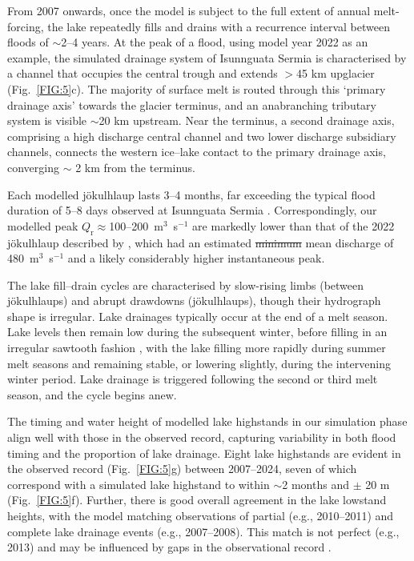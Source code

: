 \documentclass[tc, manuscript]{copernicus}
\providecommand{\DIFadd}[1]{{\protect\color{blue}\uwave{#1}}} %
\providecommand{\DIFdel}[1]{{\protect\color{red}\sout{#1}}} %
\providecommand{\DIFaddbegin}{} %
\providecommand{\DIFaddend}{} %
\providecommand{\DIFdelbegin}{} %
\providecommand{\DIFdelend}{} %
\begin{document}
From 2007 onwards, once the model is subject to the full extent of annual melt-forcing, the lake repeatedly fills and drains with a recurrence interval between floods of $\sim$2--4 years. At the peak of a flood, using model year 2022 as an example, the simulated drainage system of Isunnguata Sermia is characterised by a channel that occupies the central trough and extends $>$45 km upglacier (Fig.~\ref{FIG:5}c). The majority of surface melt is routed through this `primary drainage axis' towards the glacier terminus, and an anabranching tributary system is visible $\sim$20 km upstream. Near the terminus, a second drainage axis, comprising a high discharge central channel and two lower discharge subsidiary channels, connects the western ice--lake contact to the primary drainage axis, converging $\sim$ 2 km from the terminus.

Each modelled jökulhlaup lasts 3--4 months, far exceeding the typical flood duration of 5--8 days observed at Isunnguata Sermia \citep{livingstone2025ice}. Correspondingly, our modelled peak $Q_{\mathrm{r}}\approx$100--200~m$^{3}$~s$^{-1}$ are markedly lower than that of the 2022 jökulhlaup described by \citet{livingstone2025ice}, which had an estimated \DIFdelbegin \DIFdel{minimum }\DIFdelend mean discharge of \DIFaddbegin \DIFadd{at least }\DIFaddend 480~m$^{3}$~s$^{-1}$ and a likely considerably higher instantaneous peak.

The lake fill--drain cycles are characterised by slow-rising limbs (between jökulhlaups) and abrupt drawdowns (jökulhlaups), though their hydrograph shape is irregular. Lake drainages typically occur at the end of a melt season. Lake levels then remain low during the subsequent winter, before filling in an irregular sawtooth fashion \citep[as in][]{ng2009temporal}, with the lake filling more rapidly during summer melt seasons and remaining stable, or lowering slightly, during the intervening winter period. Lake drainage is triggered following the second or third melt season, and the cycle begins anew. 

The timing and water height of modelled lake highstands in our simulation phase align well with those in the observed record, capturing variability in both flood timing and the proportion of lake drainage. Eight lake highstands are evident in the observed record (Fig.~\ref{FIG:5}g) between 2007--2024, seven of which correspond with a simulated lake highstand to within $\sim$2 months and $\pm$ 20 m (Fig.~\ref{FIG:5}f). Further, there is good overall agreement in the lake lowstand heights, with the model matching observations of partial (e.g., 2010--2011) and complete lake drainage events (e.g., 2007--2008). This match is not perfect (e.g., 2013) and may be influenced by gaps in the observational record \citep{livingstone2025ice}. 
\end{document}
